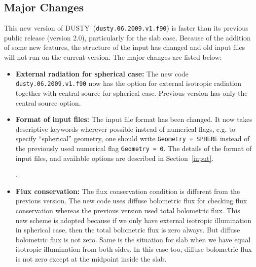 \documentclass[11pt]{article}
\def\D  {{\sf DUSTY}}
\begin{document}
\subsection{Major Changes}
\label{major_changes}

This new version of \D\ ({\tt dusty.06.2009.v1.f90}) is faster than its
previous public release (version 2.0), particularly for the slab case. Because
of the addition of some new features, the structure of the input has changed
and old input files will not run on the current version. The major changes are
listed below:
%
\begin{itemize}
\item {\bf External radiation for spherical case:} The new code {\tt
    dusty.06.2009.v1.f90} now has the option for external isotropic
    radiation together with central source for spherical case. Previous
    version has only the central source option.
%
\item {\bf Format of input files:} The input file format has been changed.
    It now takes descriptive keywords wherever possible instead of
    numerical flags, e.g. to specify ``spherical'' geometry, one should
    write {\tt  Geometry = SPHERE} instead of the previously used numerical
    flag {\tt  Geometry = 0}. The details of the format of input files, and
    available options are described in Section~\ref{input}.

.
%
\item {\bf Flux conservation:} The flux conservation condition is different
    from the previous version. The new code uses diffuse bolometric flux
    for checking flux conservation whereas the previous version used total
    bolometric flux. This new scheme is adopted because if we only have
    external isotropic illumination in spherical case, then the total
    bolometric flux is zero always. But diffuse bolometric flux is not
    zero. Same is the situation for slab when we have equal isotropic
    illumination from both sides. In this case too, diffuse bolometric flux
    is not zero except at the midpoint inside the slab.


\end{itemize}
\end{document}
